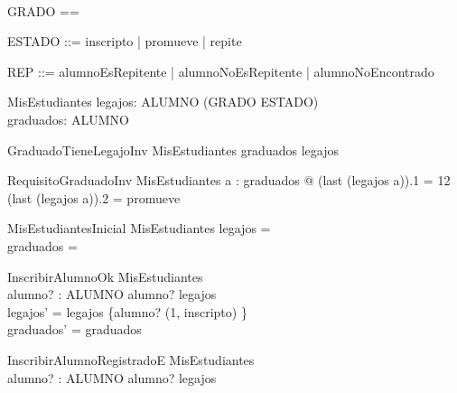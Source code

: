 \begin{zed}
    [ALUMNO] \\
\end{zed}
\begin{zed}
    GRADO == \nat \\
\end{zed}
\begin{zed}
    ESTADO ::= inscripto | promueve | repite \\
\end{zed}
\begin{zed}
    REP ::= alumnoEsRepitente | alumnoNoEsRepitente | alumnoNoEncontrado
\end{zed}

\begin{schema}{MisEstudiantes}
    legajos: ALUMNO \pfun \seq (GRADO \cross ESTADO) \\
    graduados: \power ALUMNO
\end{schema}

\begin{schema}{GraduadoTieneLegajoInv}
    MisEstudiantes
    \where
    graduados \subseteq \dom legajos
\end{schema}

\begin{schema}{RequisitoGraduadoInv}
    MisEstudiantes
    \where
    \forall a : graduados @ (last (legajos a)).1 = 12 \land (last (legajos a)).2 = promueve
\end{schema}

\begin{schema}{MisEstudiantesInicial}
    MisEstudiantes
    \where
    legajos = \emptyset \\
    graduados = \emptyset
\end{schema}

\begin{schema}{InscribirAlumnoOk}
    \Delta MisEstudiantes \\
    alumno? : ALUMNO
    \where
    alumno? \notin \dom legajos \\
    legajos' = legajos \cup \{alumno? \mapsto \langle (1, inscripto) \rangle\} \\
    graduados' = graduados
\end{schema}

\begin{schema}{InscribirAlumnoRegistradoE}
    \Xi MisEstudiantes \\
    alumno? : ALUMNO
    \where
    alumno? \in \dom legajos
\end{schema}

